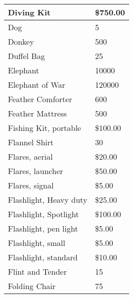 \documentclass[twoside]{book}
\begin{document}
\begin{longtable}{p{1.25in}l}
  \raggedright
           Diving Kit 
  &
   \$750.00 
  \tabularnewline
  \hline
      
  \raggedright
           Dog 
  &
   5 
  \tabularnewline
  \hline
      
  \raggedright
           Donkey 
  &
   500 
  \tabularnewline
  \hline
      
  \raggedright
           Duffel Bag 
  &
   25 
  \tabularnewline
  \hline
      
  \raggedright
           Elephant 
  &
   10000 
  \tabularnewline
  \hline
      
  \raggedright
           Elephant of War 
  &
   120000 
  \tabularnewline
  \hline
      
  \raggedright
           Feather Comforter 
  &
   600 
  \tabularnewline
  \hline
      
  \raggedright
           Feather Mattress 
  &
   500 
  \tabularnewline
  \hline
      
  \raggedright
           Fishing Kit, portable 
  &
   \$100.00 
  \tabularnewline
  \hline
      
  \raggedright
           Flannel Shirt 
  &
   30 
  \tabularnewline
  \hline
      
  \raggedright
           Flares, aerial 
  &
   \$20.00 
  \tabularnewline
  \hline
      
  \raggedright
           Flares, launcher 
  &
   \$50.00 
  \tabularnewline
  \hline
      
  \raggedright
           Flares, signal 
  &
   \$5.00 
  \tabularnewline
  \hline
      
  \raggedright
           Flashlight, Heavy duty 
  &
   \$25.00 
  \tabularnewline
  \hline
      
  \raggedright
           Flashlight, Spotlight 
  &
   \$100.00 
  \tabularnewline
  \hline
      
  \raggedright
           Flashlight, pen light 
  &
   \$5.00 
  \tabularnewline
  \hline
      
  \raggedright
           Flashlight, small 
  &
   \$5.00 
  \tabularnewline
  \hline
      
  \raggedright
           Flashlight, standard 
  &
   \$10.00 
  \tabularnewline
  \hline
      
  \raggedright
           Flint and Tender 
  &
   15 
  \tabularnewline
  \hline
      
  \raggedright
           Folding Chair 
  &
   75 
  \tabularnewline
  \hline
      

\end{longtable}
\end{document}
